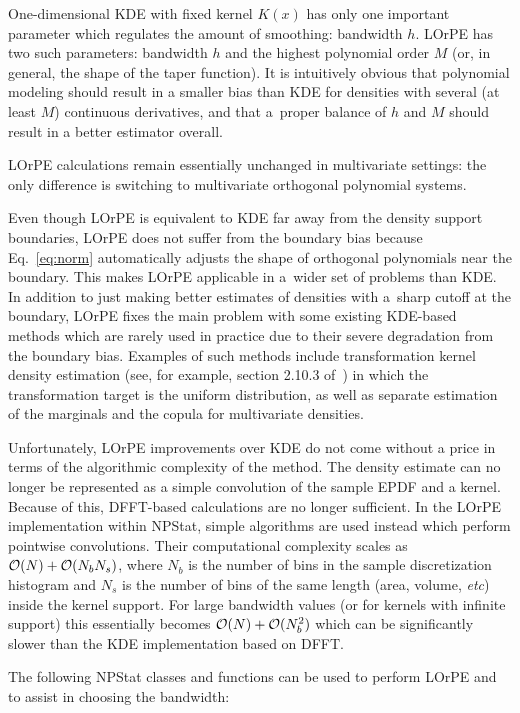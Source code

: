 \documentclass[12pt,titlepage]{article}
\begin{document}
One-dimensional KDE with fixed kernel $K(x)$ has only one important parameter
which regulates the amount of smoothing:
bandwidth $h$. LOrPE has two such parameters: bandwidth $h$ and the highest
polynomial order $M$ (or, in general, the shape of the taper function).
It is intuitively obvious that polynomial modeling
should result in a smaller bias than KDE for densities
with several (at least $M$) continuous
derivatives, and that a~proper balance of $h$ and $M$ should
result in a better estimator overall.

LOrPE calculations remain essentially unchanged
in multivariate settings: the only difference is switching to multivariate
orthogonal polynomial systems.

Even though LOrPE is equivalent to KDE far away from the density support
boundaries, LOrPE does not suffer from the boundary bias because
Eq.~\ref{eq:norm} automatically adjusts the shape of 
orthogonal polynomials near the boundary. This makes LOrPE
applicable in a~wider set of problems than KDE.
In addition to just making better estimates of densities with
a~sharp cutoff at the boundary, LOrPE fixes the main
problem with some existing KDE-based methods which are rarely
used in practice due to their severe degradation from
the boundary bias. Examples of such methods include transformation
kernel density estimation
(see, for example, section 2.10.3 of~\cite{ref:kernsmooth})
in which the transformation target is the uniform distribution,
as well as separate estimation
of the marginals and the copula for multivariate densities.

Unfortunately, LOrPE improvements over KDE do not come without
a price in terms of the algorithmic complexity of the method.
The density estimate can no longer be represented as a simple
convolution of the sample EPDF and a kernel. Because of this,
DFFT-based calculations are no longer sufficient.
In the LOrPE implementation within NPStat, simple algorithms
are used instead which perform pointwise convolutions. Their
computational complexity scales as ${\cal O}(N) + {\cal O}(N_b N_s)$, where
$N_b$ is the number of bins in the sample discretization
histogram and $N_s$ is the number of bins of the same length
(area, volume, {\it etc}) inside the kernel support. For
large bandwidth values (or for kernels with infinite support)
this essentially becomes ${\cal O}(N) + {\cal O}(N_b^2)$ which
can be significantly slower than the KDE implementation based on DFFT.

The following NPStat classes and functions can be used to perform LOrPE
and to assist in choosing the bandwidth:
\end{document}
